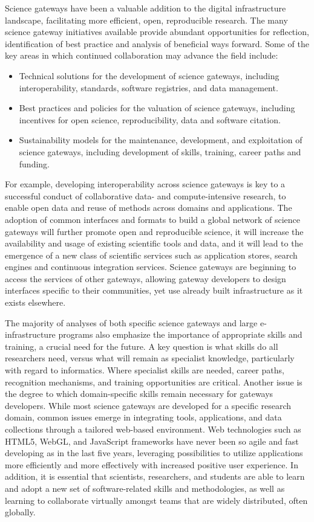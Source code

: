 \documentclass[review]{elsarticle}
\begin{document}
Science gateways have been a valuable addition to the digital infrastructure landscape, facilitating more efficient, open, reproducible research. The many science gateway initiatives available provide abundant opportunities for reflection, identification of best practice and analysis of beneficial ways forward. Some of the key areas in which continued collaboration may advance the field include:
\begin{itemize}
	\item Technical solutions for the development of science gateways, including interoperability, standards, software registries, and data management.
	\item Best practices and policies for the valuation of science gateways, including incentives for open science, reproducibility, data and software citation.
	\item Sustainability models for the maintenance, development, and exploitation of science gateways, including development of skills, training, career paths and funding.
\end{itemize}

For example, developing interoperability across science gateways is key to a successful conduct of collaborative data- and compute-intensive research, to enable open data and reuse of methods across domains and applications. The adoption of common interfaces and formats to build a global network of science gateways will further promote open and reproducible science, it will increase the availability and usage of existing scientific tools and data, and it will lead to the emergence of a new class of scientific services such as application stores, search engines and continuous integration services. Science gateways are beginning to access the services of other gateways, allowing gateway developers to design interfaces specific to their communities, yet use already built infrastructure as it exists elsewhere.

The majority of analyses of both specific science gateways and large e-infrastructure programs also emphasize the importance of appropriate skills and training, a crucial need for the future. A key question is what skills do all researchers need, versus what will remain as specialist knowledge, particularly with regard to informatics. Where specialist skills are needed, career paths, recognition mechanisms, and training opportunities are critical. Another issue is the degree to which domain-specific skills remain necessary for gateways developers. While most science gateways are developed for a specific research domain, common issues emerge in integrating tools, applications, and data collections through a tailored web-based environment. Web technologies such as HTML5, WebGL, and JavaScript frameworks have never been so agile and fast developing as in the last five years, leveraging possibilities to utilize applications more efficiently and more effectively with increased positive user experience.  In addition, it is essential that scientists, researchers, and students are able to learn and adopt a new set of software-related skills and methodologies, as well as learning to collaborate virtually amongst teams that are widely distributed, often globally.  
\end{document}
